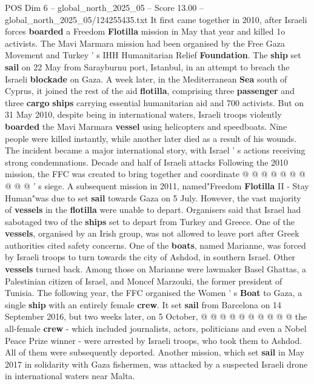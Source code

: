 \begin{textsample}{POS Dim 6 – global\_north\_2025\_05 – Score 13.00 – global\_north\_2025\_05/124255435.txt}  \label{ex:f6_pos_045}
It first came together in 2010, after Israeli forces \textbf{boarded} a Freedom \textbf{Flotilla} mission in May that year and killed 1o activists.
The Mavi Marmara mission had been organised by the Free Gaza Movement and Turkey ' s IHH Humanitarian Relief \textbf{Foundation}.
The \textbf{ship} set \textbf{sail} on 22 May from Sarayburnu port, Istanbul, in an attempt to breach the Israeli \textbf{blockade} on Gaza.
A week later, in the Mediterranean \textbf{Sea} south of Cyprus, it joined the rest of the aid \textbf{flotilla}, comprising three \textbf{passenger} and three \textbf{cargo} \textbf{ships} carrying essential humanitarian aid and 700 activists.
But on 31 May 2010, despite being in international waters, Israeli troops violently \textbf{boarded} the Mavi Marmara \textbf{vessel} using helicopters and speedboats.
Nine people were killed instantly, while another later died as a result of his wounds.
The incident became a major international story, with Israel ' s actions receiving strong condemnations.
Decade and half of Israeli attacks Following the 2010 mission, the FFC was created to bring together and coordinate @ @ @ @ @ @ @ @ @ @ ' s siege.
A subsequent mission in 2011, named"Freedom \textbf{Flotilla} II - Stay Human"was due to set \textbf{sail} towards Gaza on 5 July.
However, the vast majority of \textbf{vessels} in the \textbf{flotilla} were unable to depart.
Organisers said that Israel had sabotaged two of the \textbf{ships} set to depart from Turkey and Greece.
One of the \textbf{vessels}, organised by an Irish group, was not allowed to leave port after Greek authorities cited safety concerns.
One of the \textbf{boats}, named Marianne, was forced by Israeli troops to turn towards the city of Ashdod, in southern Israel.
Other \textbf{vessels} turned back.
Among those on Marianne were lawmaker Basel Ghattas, a Palestinian citizen of Israel, and Moncef Marzouki, the former president of Tunisia.
The following year, the FFC organised the Women ' s \textbf{Boat} to Gaza, a single \textbf{ship} with an entirely female \textbf{crew}.
It set \textbf{sail} from Barcelona on 14 September 2016, but two weeks later, on 5 October, @ @ @ @ @ @ @ @ @ @ the all-female \textbf{crew} - which included journalists, actors, politicians and even a Nobel Peace Prize winner - were arrested by Israeli troops, who took them to Ashdod.
All of them were subsequently deported.
Another mission, which set \textbf{sail} in May 2017 in solidarity with Gaza fishermen, was attacked by a suspected Israeli drone in international waters near Malta.

\end{textsample}
